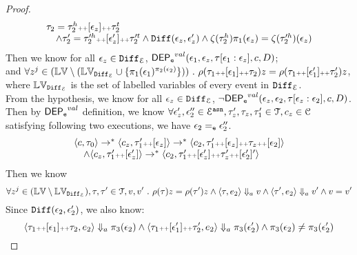 \begin{proof}
\[\begin{array}{l}
	\trace_2 = \trace_2^h \tracecat [\event_z] \tracecat \trace_2^t
	\\ \quad
	\land 
	\trace_2' = \trace'^h_2 \tracecat [\event_z'] \tracecat \trace'^t_2
	\land 
	\diff(\event_z, \event_z')
	\land 
	\vcounter(\trace_2^h) \pi_1(\event_z) = \vcounter(\trace'^h_2)(\event_z)
\end{array}		
\]
%
Then we know for all $\event_z \in  \diff_{\eventset}$,
 $\eventdep^{val}(\event_1, \event_z, \trace[\event_1:\event_z], c, D)$;
\\
and $\forall z^j \in (\lvar \setminus (\mathbb{LV}_{\diff_{\eventset}} \cup\{\pi_1(\event_1)^{\pi_2(\event_2)}\}) ) \st 
\env(\trace_1 \tracecat [\event_1] \tracecat \trace_2) z = \env(\trace_1 \tracecat [\event_1'] \tracecat \trace_2') z $,
\\
where $\mathbb{LV}_{\diff_{\eventset}}$ is the set of labelled variables of every event in $\diff_{\eventset}$.
\\
From the hypothesis, we know for all $\event_z \in  \diff_{\eventset}$, $\neg \eventdep^{val}(\event_z, \event_2, \trace[\event_z:\event_2], c, D) $.
\\
Then by $\eventdep^{val}$ definition, we know 
$\forall \event_z', \event_2'' \in \eventset^{\asn}, \trace_z',\trace_z,  \trace_1' \in \mathcal{T}, c_z \in \cdom$ satisfying following two executions, we have $\event_2 \eventeq \event_2''$.
\[
	\begin{array}{l}
		\config{c, \trace_0} \rightarrow^{*}
		\config{c_z, \trace_1' \tracecat [\event_z]} \rightarrow^{*} \config{c_2, \trace_1' \tracecat [\event_z] \tracecat \trace_z \tracecat [\event_2]} 
		\\ \quad
		\land
		\config{c_z, \trace_1' \tracecat [\event_z']} \rightarrow^{*} \config{c_2, \trace_1' \tracecat [\event_z'] \tracecat \trace_z' \tracecat [\event_2']'} 
		\end{array}		
\]
%
Then we know 
\[
	\forall z^j \in (\lvar \setminus \mathbb{LV}_{\diff_{\eventset}} ), \trace, \trace' \in \mathcal{T}, v, v' \st 
	\env(\trace) z = \env(\trace') z 
	\land 
	\config{\trace, \expr_2} \aarrow v 
	\land 
	\config{\trace', \expr_2} \aarrow v'
	\land 
	v = v' 
\]
%
Since $\diff(\event_2, \event_2')$, we also know:
%
\[	
\config{\trace_1 \tracecat [\event_1] \tracecat \trace_2, \expr_2} \aarrow \pi_3(\event_2)
\land 
\config{\trace_1 \tracecat [\event_1'] \tracecat \trace_2', \expr_2} \aarrow \pi_3(\event_2') 
\land 
\pi_3(\event_2) \neq \pi_3(\event_2')
\]
%

\end{proof}

